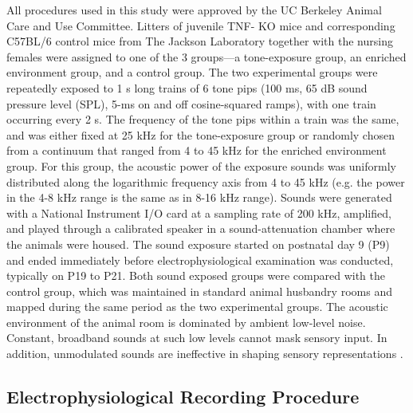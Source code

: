 All procedures used in this study were approved by the UC Berkeley Animal Care and Use Committee. Litters of juvenile TNF-\textalpha{} KO mice and corresponding C57BL/6 control mice from The Jackson Laboratory together with the nursing females were assigned to one of the 3 groups---a tone-exposure group, an enriched environment group, and a control group. The two experimental groups were repeatedly exposed to 1 s long trains of 6 tone pips (100 ms, 65 dB sound pressure level (SPL), 5-ms on and off cosine-squared ramps), with one train occurring every 2 s. The frequency of the tone pips within a train was the same, and was either fixed at 25 kHz for the tone-exposure group or randomly chosen from a continuum that ranged from 4 to 45 kHz for the enriched environment group. For this group, the acoustic power of the exposure sounds was uniformly distributed along the logarithmic frequency axis from 4 to 45 kHz (e.g. the power in the 4-8 kHz range is the same as in 8-16 kHz range). Sounds were generated with a National Instrument I/O card at a sampling rate of 200 kHz, amplified, and played through a calibrated speaker in a sound-attenuation chamber where the animals were housed. The sound exposure started on postnatal day 9 (P9) and ended immediately before electrophysiological examination was conducted, typically on P19 to P21. Both sound exposed groups were compared with the control group, which was maintained in standard animal husbandry rooms and mapped during the same period as the two experimental groups. The acoustic environment of the animal room is dominated by ambient low-level noise. Constant, broadband sounds at such low levels cannot mask sensory input. In addition, unmodulated sounds are ineffective in shaping sensory representations \cite{Kim2009}.

\subsection{Electrophysiological Recording Procedure}

